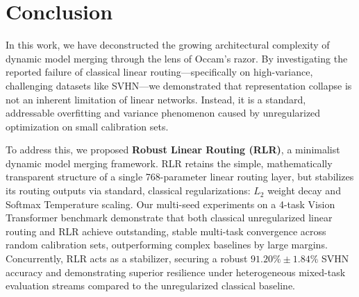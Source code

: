 \section{Conclusion}
\label{sec:conclusion}

In this work, we have deconstructed the growing architectural complexity of dynamic model merging through the lens of Occam's razor. By investigating the reported failure of classical linear routing—specifically on high-variance, challenging datasets like SVHN—we demonstrated that representation collapse is not an inherent limitation of linear networks. Instead, it is a standard, addressable overfitting and variance phenomenon caused by unregularized optimization on small calibration sets.

To address this, we proposed \textbf{Robust Linear Routing (RLR)}, a minimalist dynamic model merging framework. RLR retains the simple, mathematically transparent structure of a single 768-parameter linear routing layer, but stabilizes its routing outputs via standard, classical regularizations: $L_2$ weight decay and Softmax Temperature scaling. Our multi-seed experiments on a 4-task Vision Transformer benchmark demonstrate that both classical unregularized linear routing and RLR achieve outstanding, stable multi-task convergence across random calibration sets, outperforming complex baselines by large margins. Concurrently, RLR acts as a stabilizer, securing a robust $91.20\% \pm 1.84\%$ SVHN accuracy and demonstrating superior resilience under heterogeneous mixed-task evaluation streams compared to the unregularized classical baseline.


